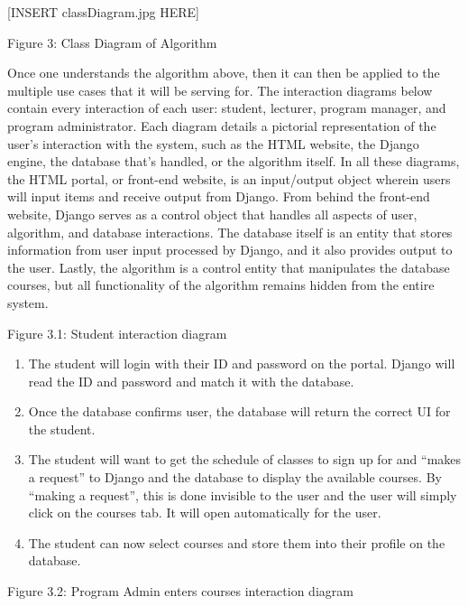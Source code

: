 \documentclass[12pt,article]{memoir}
\begin{document}
 [INSERT classDiagram.jpg HERE]

Figure 3: Class Diagram of Algorithm

Once one understands the algorithm above, then it can then be applied to the multiple use cases that it will be serving for. The interaction diagrams below contain every interaction of each user: student, lecturer, program manager, and program administrator. Each diagram details a pictorial representation of the user’s interaction with the system, such as the HTML website, the Django engine, the database that’s handled, or the algorithm itself.  In all these diagrams, the HTML portal, or front-end website, is an input/output object wherein users will input items and receive output from Django. From behind the front-end website, Django serves as a control object that handles all aspects of user, algorithm, and database interactions. The database itself is an entity that stores information from user input processed by Django, and it also provides output to the user. Lastly, the algorithm is a control entity that manipulates the database courses, but all functionality of the algorithm remains hidden from the entire system. 


Figure 3.1: Student interaction diagram

\begin{enumerate}
\item The student will login with their ID and password on the portal. Django will read the ID and password and match it with the database. 
\item Once the database confirms user, the database will return the correct UI for the student.
\item The student will want to get the schedule of classes to sign up for and “makes a request” to Django and the database to display the available courses. By “making a request”, this is done invisible to the user and the user will simply click on the courses tab. It will open automatically for the user. 
\item The student can now select courses and store them into their profile on the database. 
\end{enumerate}


 Figure 3.2: Program Admin enters courses interaction diagram
\end{document}
